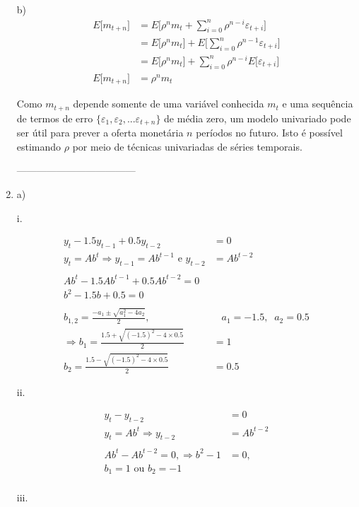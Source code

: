 \begin{enumerate}
	b) 
	\begin{align*}
		E\bigg[m_{t+n}\bigg]&=E\bigg[\rho^nm_t+\sum\limits_{i=0}^{n}\rho^{n-i}\varepsilon_{t+i}\bigg]\\
		&=E\bigg[\rho^nm_t\bigg]+E\bigg[\sum\limits_{i=0}^{n}\rho^{n-1}\varepsilon_{t+i}\bigg]\\
		&=E\bigg[\rho^nm_t\bigg]+\sum\limits_{i=0}^{n}\rho^{n-i}E\bigg[\varepsilon_{t+i}\bigg]\\
		E\bigg[m_{t+n}\bigg]&=\rho^nm_t
	\end{align*}
	
	Como $m_{t+n}$ depende somente de uma variável conhecida $m_t$ e uma sequência de termos de erro $\{\varepsilon_1,\varepsilon_2,...\varepsilon_{t+n}\}$ de média zero, um modelo univariado pode ser útil para prever a oferta monetária $n$ períodos no futuro. Isto é possível estimando $\rho$ por meio de técnicas univariadas de séries temporais.
	
	------------------------------------
	
	\item 
	a)
	 
	i.
	
	\begin{align*}
		y_t-1.5y_{t-1}+0.5y_{t-2}&=0\\
		y_t=Ab^t\Rightarrow y_{t-1}=Ab^{t-1}\text{ e }y_{t-2}&=Ab^{t-2}\\
		\\
		Ab^t-1.5Ab^{t-1}+0.5Ab^{t-2}=0\\
		b^2-1.5b+0.5=0\\
		\\
		b_{1,2}=\frac{-a_1\pm \sqrt{a_1^2-4a_2}}{2},& \;\;\;a_1=-1.5,\;\;a_2=0.5\\
		\Rightarrow b_1=\frac{1.5+\sqrt{(-1.5)^2-4 \times 0.5}}{2}&=1\\
		b_2=\frac{1.5-\sqrt{(-1.5)^2-4 \times 0.5}}{2}&=0.5
	\end{align*}
	
	ii.
	
	\begin{align*}
		y_t-y_{t-2}&=0\\
	y_t=Ab^t\Rightarrow y_{t-2}&=Ab^{t-2}\\
	\\
	Ab^t-Ab^{t-2}=0, \Rightarrow b^2-1&=0,\\
	b_1=1\text{ ou }b_2=-1\\
	\end{align*}
	
	iii.
	

\end{enumerate}
